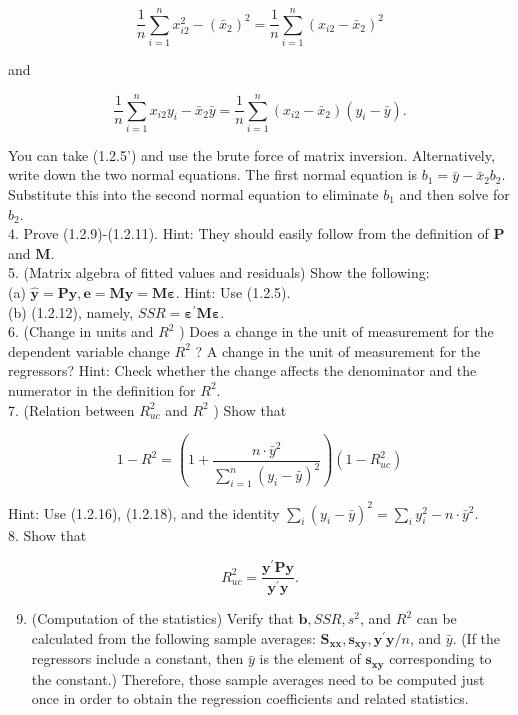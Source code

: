 \documentclass[10pt]{article}
\begin{document}
$$
\frac{1}{n} \sum_{i=1}^{n} x_{i 2}^{2}-\left(\bar{x}_{2}\right)^{2}=\frac{1}{n} \sum_{i=1}^{n}\left(x_{i 2}-\bar{x}_{2}\right)^{2}
$$

and

$$
\frac{1}{n} \sum_{i=1}^{n} x_{i 2} y_{i}-\bar{x}_{2} \bar{y}=\frac{1}{n} \sum_{i=1}^{n}\left(x_{i 2}-\bar{x}_{2}\right)\left(y_{i}-\bar{y}\right) .
$$

You can take (1.2.5') and use the brute force of matrix inversion. Alternatively, write down the two normal equations. The first normal equation is $b_{1}=\bar{y}-\bar{x}_{2} b_{2}$. Substitute this into the second normal equation to eliminate $b_{1}$ and then solve for $b_{2}$.\\
4. Prove (1.2.9)-(1.2.11). Hint: They should easily follow from the definition of $\mathbf{P}$ and $\mathbf{M}$.\\
5. (Matrix algebra of fitted values and residuals) Show the following:\\
(a) $\hat{\mathbf{y}}=\mathbf{P y}, \mathbf{e}=\mathbf{M y}=\mathbf{M} \boldsymbol{\varepsilon}$. Hint: Use (1.2.5).\\
(b) (1.2.12), namely, $S S R=\boldsymbol{\varepsilon}^{\prime} \mathbf{M} \boldsymbol{\varepsilon}$.\\
6. (Change in units and $R^{2}$ ) Does a change in the unit of measurement for the dependent variable change $R^{2}$ ? A change in the unit of measurement for the regressors? Hint: Check whether the change affects the denominator and the numerator in the definition for $R^{2}$.\\
7. (Relation between $R_{u c}^{2}$ and $R^{2}$ ) Show that

$$
1-R^{2}=\left(1+\frac{n \cdot \bar{y}^{2}}{\sum_{i=1}^{n}\left(y_{i}-\bar{y}\right)^{2}}\right)\left(1-R_{u c}^{2}\right)
$$

Hint: Use (1.2.16), (1.2.18), and the identity $\sum_{i}\left(y_{i}-\bar{y}\right)^{2}=\sum_{i} y_{i}^{2}-n \cdot \bar{y}^{2}$.\\
8. Show that

$$
R_{u c}^{2}=\frac{\mathbf{y}^{\prime} \mathbf{P y}}{\mathbf{y}^{\prime} \mathbf{y}} .
$$

\begin{enumerate}
  \setcounter{enumi}{8}
  \item (Computation of the statistics) Verify that $\mathbf{b}, S S R, s^{2}$, and $R^{2}$ can be calculated from the following sample averages: $\mathbf{S}_{\mathbf{x x}}, \mathbf{s}_{\mathbf{x y}}, \mathbf{y}^{\prime} \mathbf{y} / n$, and $\bar{y}$. (If the regressors include a constant, then $\bar{y}$ is the element of $\mathbf{s}_{\mathbf{x y}}$ corresponding to the constant.) Therefore, those sample averages need to be computed just once in order to obtain the regression coefficients and related statistics.
\end{enumerate}
\end{document}
